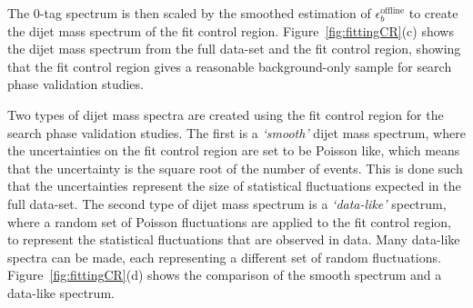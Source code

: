 The 0-tag spectrum is then scaled by the smoothed estimation of $\epsilon_b^{\text{offline}}$ to create the dijet mass spectrum of the fit control region.
Figure~\ref{fig:fittingCR}(c) shows the dijet mass spectrum from the full \lm{} data-set and the fit control region,
showing that the fit control region gives a reasonable background-only sample for search phase validation studies.

Two types of dijet mass spectra are created using the fit control region for the search phase validation studies.
The first is a \textit{`smooth'} dijet mass spectrum, where the uncertainties on the fit control region are set to be Poisson like,
which means that the uncertainty is the square root of the number of events.
This is done such that the uncertainties represent the size of statistical fluctuations expected in the full \lm{} data-set.
The second type of dijet mass spectrum is a \textit{`data-like'} spectrum,
where a random set of Poisson fluctuations are applied to the fit control region,
to represent the statistical fluctuations that are observed in data.
Many data-like spectra can be made, each representing a different set of random fluctuations.
Figure~\ref{fig:fittingCR}(d) shows the comparison of the smooth spectrum and a data-like spectrum.

